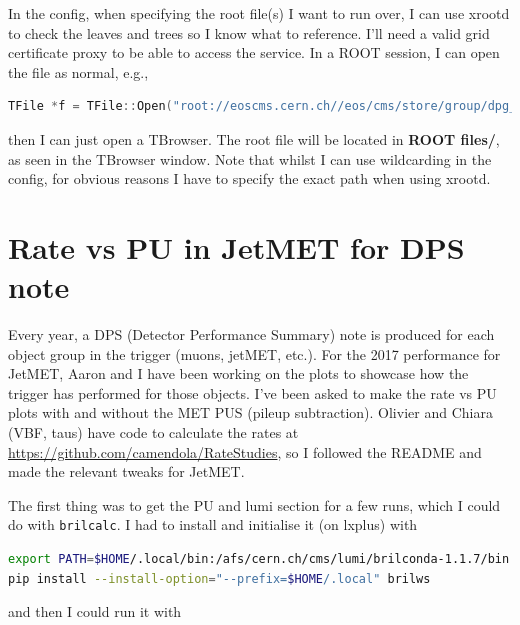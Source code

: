 In the config, when specifying the root file(s) I want to run over, I can use xrootd to check the leaves and trees so I know what to reference. I'll need a valid grid certificate proxy to be able to access the service. In a ROOT session, I can open the file as normal, e.g.,

\begin{lstlisting}[belowskip=-0.7cm, language=C++, numbers=none]
TFile *f = TFile::Open("root://eoscms.cern.ch//eos/cms/store/group/dpg_trigger/comm_trigger/L1Trigger/safarzad/2017/ZeroBias/Collision2017-noRECO-l1t-integration-96p20/ZeroBias/crab_Collision2017-noRECO-l1t-integration-96p20__ZeroBias_Run2017C/170726_094745/0000/L1Ntuple_1.root")
\end{lstlisting}

then I can just open a TBrowser. The root file will be located in \textbf{ROOT files/}, as seen in the TBrowser window. Note that whilst I can use wildcarding in the config, for obvious reasons I have to specify the exact path when using xrootd.

\fi



\section{Rate vs PU in JetMET for DPS note}

Every year, a DPS (Detector Performance Summary) note is produced for each object group in the trigger (muons, jetMET, etc.). For the 2017 performance for JetMET, Aaron and I have been working on the plots to showcase how the trigger has performed for those objects. I've been asked to make the rate vs PU plots with and without the MET PUS (pileup subtraction). Olivier and Chiara (VBF, taus) have code to calculate the rates at \url{https://github.com/camendola/RateStudies}, so I followed the README and made the relevant tweaks for JetMET.

The first thing was to get the PU and lumi section for a few runs, which I could do with \texttt{brilcalc}. I had to install and initialise it (on lxplus) with

\begin{lstlisting}[belowskip=-0.7cm, language=sh, numbers=none]
export PATH=$HOME/.local/bin:/afs/cern.ch/cms/lumi/brilconda-1.1.7/bin:$PATH # Needed each time to initialise
pip install --install-option="--prefix=$HOME/.local" brilws
\end{lstlisting}

and then I could run it with


